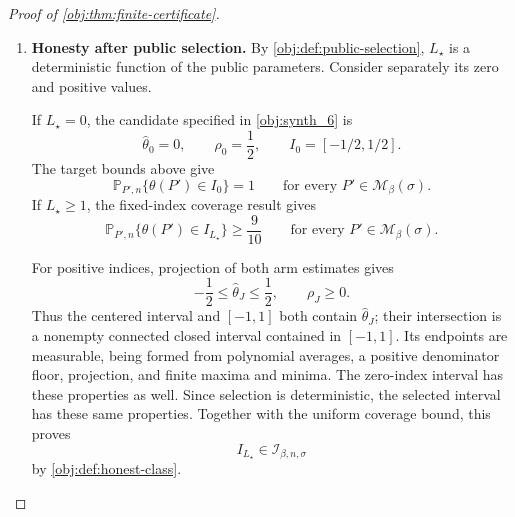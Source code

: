 \begin{proof}[Proof of \cref{obj:thm:finite-certificate}]
\begin{enumerate}
The cutoff mean bounds imply
\[
-\frac12\le\theta(P')\le\frac12.
\]
Thus, on \(\Gamma_J\),
\[
\max\{-1,\widehat\theta_J-\rho_J\}
\le\theta(P')
\le\min\{1,\widehat\theta_J+\rho_J\}.
\]
These are precisely the endpoints of \(I_J\) in
\cref{obj:synth_6}. Therefore
\[
\mathbb P_{P',n}\{\theta(P')\in I_J\}\ge\frac9{10}.
\]
Since \(J\ge1\) and \(P'\) were arbitrary, substituting \(J=L\) and \(P'=P\) proves all three fixed-index assertions.

\item \textbf{Honesty after public selection.}
By \cref{obj:def:public-selection}, \(L_\star\) is a deterministic function of the public parameters. Consider separately its zero and positive values.

If \(L_\star=0\), the candidate specified in \cref{obj:synth_6} is
\[
\widehat\theta_0=0,
\qquad
\rho_0=\frac12,
\qquad
I_0=[-1/2,1/2].
\]
The target bounds above give
\[
\mathbb P_{P',n}\{\theta(P')\in I_0\}=1
\qquad\text{for every }P'\in\mathcal M_\beta(\sigma).
\]
If \(L_\star\ge1\), the fixed-index coverage result gives
\[
\mathbb P_{P',n}\{\theta(P')\in I_{L_\star}\}
\ge\frac9{10}
\qquad\text{for every }P'\in\mathcal M_\beta(\sigma).
\]

For positive indices, projection of both arm estimates gives
\[
-\frac12\le\widehat\theta_J\le\frac12,
\qquad
\rho_J\ge0.
\]
Thus the centered interval and \([-1,1]\) both contain
\(\widehat\theta_J\); their intersection is a nonempty connected closed interval contained in \([-1,1]\). Its endpoints are measurable, being formed from polynomial averages, a positive denominator floor, projection, and finite maxima and minima. The zero-index interval has these properties as well. Since selection is deterministic, the selected interval has these same properties. Together with the uniform coverage bound, this proves
\[
I_{L_\star}\in\mathcal I_{\beta,n,\sigma}
\]
by \cref{obj:def:honest-class}.


\end{enumerate}
\end{proof}
